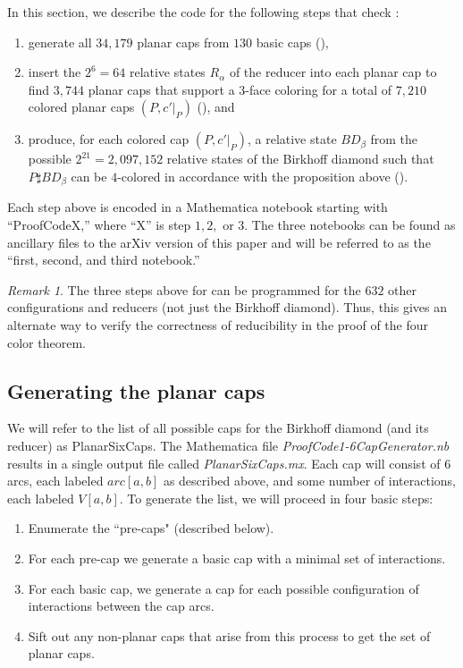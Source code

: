 \documentclass[12pt]{amsart}
\theoremstyle{definition}
\theoremstyle{remark}
\newtheorem{remark}[theorem]{Remark}
\numberwithin{equation}{section}
\begin{document}
In this section, we describe the code for the following steps that check :
\begin{enumerate}
\item generate all $34,179$ planar caps from $130$ basic caps (), 
\item insert the $2^6=64$ relative states $R_\alpha$ of the reducer into each planar cap to find $3,744$ planar caps that support a $3$-face coloring  for a total of $7,210$ colored planar caps $(P,c'|_P)$ (), and
\item produce, for each colored cap $(P,c'|_P)$, a relative state $BD_\beta$ from the possible $2^{21}=2,097,152$ relative states of the Birkhoff diamond such that $P\sharp BD_\beta$ can be $4$-colored in accordance with the proposition above (). 
\end{enumerate}

Each step above is encoded in a Mathematica notebook starting with ``ProofCodeX,'' where ``X'' is step $1,2,$ or $3$. The three  notebooks can be found as ancillary files to the arXiv version of this paper and will be referred to as the ``first, second, and third notebook.''

\begin{remark} The three steps above for  can be programmed for the $632$ other configurations and reducers (not just the Birkhoff diamond). Thus, this gives an alternate way to verify the correctness of reducibility in the proof  of the four color theorem.
\end{remark}


\subsection{Generating the planar caps}\label{sec:generating-the-caps}
We will refer to the list of all possible caps for the Birkhoff diamond (and its reducer) as PlanarSixCaps.  The Mathematica file \emph{ProofCode1-6CapGenerator.nb} results in a single output file called \emph{PlanarSixCaps.mx}.  Each cap will consist of 6 arcs, each labeled $arc[a,b]$ as described above, and some number of interactions, each labeled $V[a,b]$.  To generate the list, we will proceed in four basic steps:
\begin{enumerate}
\item Enumerate the ``pre-caps" (described below).
\item For each pre-cap we generate a basic cap with a minimal set of interactions.
\item For each basic cap, we generate a cap for each possible configuration of interactions between the cap arcs.
\item Sift out any non-planar caps that arise from this process to get the set of planar caps.
\end{enumerate}
\end{document}
